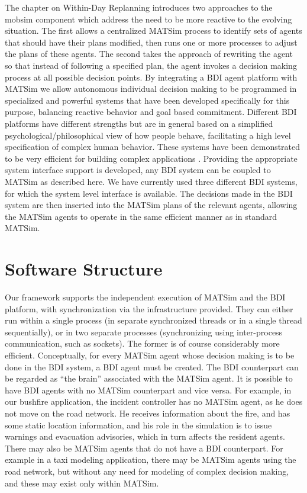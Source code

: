 The chapter on Within-Day Replanning introduces two approaches to the
mobsim component which address the need to be more reactive to the
evolving situation. The first allows a centralized MATSim process to
identify sets of agents that should have their plans modified, then
runs one or more processes to adjust the plans of these agents. The
second takes the approach of rewriting the agent so that instead of
following a specified plan, the agent invokes a decision making
process at all possible decision points. By integrating a BDI agent
platform with MATSim \cite{ecai} we allow autonomous individual
decision making to be programmed in specialized and powerful systems
that have been developed specifically for this purpose, balancing
reactive behavior and goal based commitment. Different BDI platforms
have different strengths but are in general based on a simplified
psychological/philosophical view of how people behave, facilitating a
high level specification of complex human behavior. These systems have
been demonstrated to be very efficient for building complex
applications \cite{benfield}.  Providing the appropriate system
interface support is developed, any BDI system can be coupled to
MATSim as described here. We have currently used three different BDI
systems, for which the system level interface is available.  The
decisions made in the BDI system are then inserted into the MATSim
plans of the relevant agents, allowing the MATSim agents to operate in
the same efficient manner as in standard MATSim.

\section{Software Structure}
\label{sec:bdi-structure}
Our framework supports the independent execution of MATSim and the BDI platform, with 
synchronization via the infrastructure provided.
They can either run within a single process (in
separate synchronized threads or in a single thread sequentially), or in two
separate processes (synchronizing using inter-process communication, such as
sockets). The former is of course considerably more efficient. 
%
Conceptually, for every MATSim agent whose decision making is to be
done in the BDI system, a BDI agent must be created. The BDI counterpart can
be regarded as ``the brain'' associated with the MATSim agent. It is
possible to have BDI agents with no MATSim counterpart and vice
versa. For example, in our bushfire application, the incident
controller has no MATSim agent, as he does not move on the road
network. He receives information about the fire, and has some static
location information, and his role in the simulation is to issue
warnings and evacuation advisories, which in turn affects the resident
agents. There may also be MATSim agents that do not have a BDI
counterpart. For example in a taxi modeling application, there may be
MATSim agents using the road network, but without any need for
modeling of complex decision making, and these may exist only within
MATSim. 


